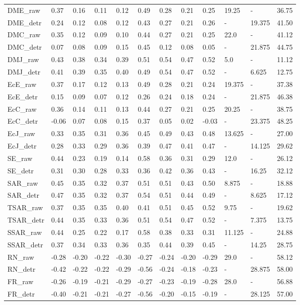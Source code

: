 \begin{tabular}{lllllllllllr}
\midrule
DME\_raw & 0.37 & 0.16 & 0.11 & 0.12 & 0.49 & 0.28 & 0.21 & 0.25 & 19.25 & - & 36.75 \\
DME\_detr & 0.24 & 0.12 & 0.08 & 0.12 & 0.43 & 0.27 & 0.21 & 0.26 & - & 19.375 & 41.50 \\
\midrule
DMC\_raw & 0.35 & 0.12 & 0.09 & 0.10 & 0.44 & 0.27 & 0.21 & 0.25 & 22.0 & - & 41.12 \\
DMC\_detr & 0.07 & 0.08 & 0.09 & 0.15 & 0.45 & 0.12 & 0.08 & 0.05 & - & 21.875 & 44.75 \\
\midrule
DMJ\_raw & 0.43 & 0.38 & 0.34 & 0.39 & 0.51 & 0.54 & 0.47 & 0.52 & 5.0 & - & 11.12 \\
DMJ\_detr & 0.41 & 0.39 & 0.35 & 0.40 & 0.49 & 0.54 & 0.47 & 0.52 & - & 6.625 & 12.75 \\
\midrule
EcE\_raw & 0.37 & 0.17 & 0.12 & 0.13 & 0.49 & 0.28 & 0.21 & 0.24 & 19.375 & - & 37.38 \\
EcE\_detr & 0.15 & 0.09 & 0.07 & 0.12 & 0.26 & 0.24 & 0.18 & 0.24 & - & 21.875 & 46.38 \\
\midrule
EcC\_raw & 0.36 & 0.14 & 0.11 & 0.13 & 0.44 & 0.27 & 0.21 & 0.25 & 20.25 & - & 38.75 \\
EcC\_detr & -0.06 & 0.07 & 0.08 & 0.15 & 0.37 & 0.05 & 0.02 & -0.03 & - & 23.375 & 48.25 \\
\midrule
EcJ\_raw & 0.33 & 0.35 & 0.31 & 0.36 & 0.45 & 0.49 & 0.43 & 0.48 & 13.625 & - & 27.00 \\
EcJ\_detr & 0.28 & 0.33 & 0.29 & 0.36 & 0.39 & 0.47 & 0.41 & 0.47 & - & 14.125 & 29.62 \\
\midrule
SE\_raw & 0.44 & 0.23 & 0.19 & 0.14 & 0.58 & 0.36 & 0.31 & 0.29 & 12.0 & - & 26.12 \\
SE\_detr & 0.31 & 0.30 & 0.28 & 0.33 & 0.36 & 0.42 & 0.36 & 0.43 & - & 16.25 & 32.12 \\
\midrule
SAR\_raw & 0.45 & 0.35 & 0.32 & 0.37 & 0.51 & 0.51 & 0.43 & 0.50 & 8.875 & - & 18.88 \\
SAR\_detr & 0.47 & 0.35 & 0.32 & 0.37 & 0.54 & 0.51 & 0.44 & 0.49 & - & 8.625 & 17.12 \\
\midrule
TSAR\_raw & 0.37 & 0.35 & 0.35 & 0.40 & 0.41 & 0.51 & 0.45 & 0.52 & 9.75 & - & 19.62 \\
TSAR\_detr & 0.44 & 0.35 & 0.33 & 0.36 & 0.51 & 0.54 & 0.47 & 0.52 & - & 7.375 & 13.75 \\
\midrule
SSAR\_raw & 0.44 & 0.25 & 0.22 & 0.17 & 0.58 & 0.38 & 0.33 & 0.31 & 11.125 & - & 24.88 \\
SSAR\_detr & 0.37 & 0.34 & 0.33 & 0.36 & 0.35 & 0.44 & 0.39 & 0.45 & - & 14.25 & 28.75 \\
\midrule
RN\_raw & -0.28 & -0.20 & -0.22 & -0.30 & -0.27 & -0.24 & -0.20 & -0.29 & 29.0 & - & 58.12 \\
RN\_detr & -0.42 & -0.22 & -0.22 & -0.29 & -0.56 & -0.24 & -0.18 & -0.23 & - & 28.875 & 58.00 \\
\midrule
FR\_raw & -0.26 & -0.19 & -0.21 & -0.29 & -0.27 & -0.23 & -0.19 & -0.28 & 28.0 & - & 56.88 \\
FR\_detr & -0.40 & -0.21 & -0.21 & -0.27 & -0.56 & -0.20 & -0.15 & -0.19 & - & 28.125 & 57.00 \\
\midrule
\bottomrule
\end{tabular}
\midrule
